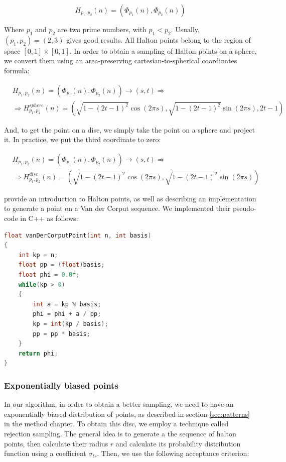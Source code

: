 $$
H_{p_1,p_2}(n) = (\Phi_{p_1}(n), \Phi_{p_2}(n))
$$ 

Where $p_1$ and $p_2$ are two prime numbers, with $p_1 < p_2$. Usually, $(p_1,p_2) = (2,3)$ gives good results. All Halton points belong to the region of space $[0,1]\times[0,1]$. In order to obtain a sampling of Halton points on a sphere, we convert them using an area-preserving cartesian-to-spherical coordinates formula:

\begin{equation*}
\begin{split}
&H_{p_1,p_2}(n) = (\Phi_{p_1}(n), \Phi_{p_2}(n)) \rightarrow (s,t) \Rightarrow \\
&\Rightarrow H^{sphere}_{p_1,p_2}(n) = (\sqrt{1 - (2t - 1) ^2} \cos(2\pi s),\sqrt{1 - (2t - 1) ^2} \sin(2\pi s), 2t-1) 
\end{split}
\end{equation*}

And, to get the point on a disc, we simply take the point on a sphere and project it. In practice, we put the third coordinate to zero:

\begin{equation*}
\begin{split}
&H_{p_1,p_2}(n) = (\Phi_{p_1}(n), \Phi_{p_2}(n)) \rightarrow (s,t) \Rightarrow\\
& \Rightarrow H^{disc}_{p_1,p_2}(n) = (\sqrt{1 - (2t - 1) ^2} \cos(2\pi s),\sqrt{1 - (2t - 1) ^2} \sin(2\pi s)) 
\end{split}
\end{equation*}

\cite{journals/jgtools/WongLH97} provide an introduction to Halton points, as well as describing an implementation to generate a point on a Van der Corput sequence. We implemented their pseudo-code in C++ as follows:

\begin{lstlisting}[language=C++,label=lst:vandercorput,caption={Generating the p-adic Van der Corput point.}]
float vanDerCorputPoint(int n, int basis)
{
    int kp = n;
    float pp = (float)basis;
    float phi = 0.0f;
    while(kp > 0)
    {
        int a = kp % basis;
        phi = phi + a / pp;
        kp = int(kp / basis);
        pp = pp * basis;
    }
    return phi;
}
\end{lstlisting}

\subsubsection{Exponentially biased points}
In our algorithm, in order to obtain a better sampling, we need to have an exponentially biased distribution of points, as described in section \ref{sec:patterns} in the method chapter. To obtain this disc, we employ a technique called rejection sampling. The general idea is to generate a the sequence of halton points, then calculate their radius $r$ and calculate its probability distribution function using a coefficient $\sigma_{tr}$. Then, we use the following acceptance criterion:

